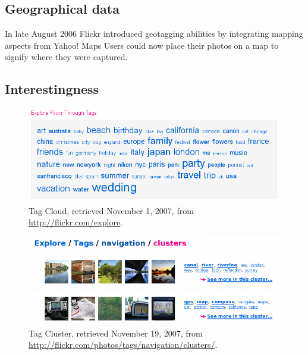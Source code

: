 \subsection{Geographical data}

In late August 2006 Flickr introduced geotagging abilities
\citep{butterfield06} by integrating mapping aspects from Yahoo! Maps%
Users could now place their photos on a
map to signify where they were captured.

\subsection{Interestingness}

\begin{figure}[b]
  \begin{whole}
    \includegraphics[width=\wholewidth]{scrsh_flickr_tagcloud}
    \caption[Flickr Tag Cloud]{%
       Tag Cloud,
       retrieved November 1, 2007, from \url{http://flickr.com/explore}.}
    \label{figure:scrsh.flickr.tagcloud}
  \end{whole}
\end{figure}

\begin{figure}[b]
  \begin{whole}
    \includegraphics[width=\wholewidth]{scrsh_flickr_tagcluster}
    \caption[Flickr Tag Cluster]{%
       Tag Cluster,
       retrieved November 19, 2007, from
       \url{http://flickr.com/photos/tags/navigation/clusters/}.}
    \label{figure:scrsh.flickr.tagcluster}
  \end{whole}
\end{figure}

